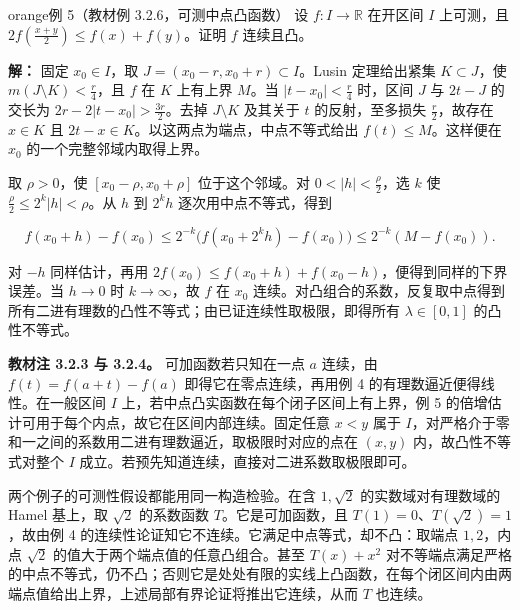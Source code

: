\documentclass[11pt,a4paper]{article}
\begin{document}
\begin{sboxenv}{orange}{例 5（教材例 3.2.6，可测中点凸函数）}
设 \(f:I\to\mathbb R\) 在开区间 \(I\) 上可测，且
\(2f(\frac{x+y}{2})\le f(x)+f(y)\)。证明 \(f\) 连续且凸。

\end{sboxenv}

\textbf{解：} 固定 \(x_0\in I\)，取 \(J=(x_0-r,x_0+r)\subset I\)。Lusin
定理给出紧集 \(K\subset J\)，使 \(m(J\setminus K)<\frac{r}{4}\)，且
\(f\) 在 \(K\) 上有上界 \(M\)。当 \(|t-x_0|<\frac{r}{4}\) 时，区间 \(J\)
与 \(2t-J\) 的交长为 \(2r-2|t-x_0|>\frac{3r}{2}\)。去掉 \(J\setminus K\)
及其关于 \(t\) 的反射，至多损失 \(\frac{r}{2}\)，故存在 \(x\in K\) 且
\(2t-x\in K\)。以这两点为端点，中点不等式给出 \(f(t)\le M\)。这样便在
\(x_0\) 的一个完整邻域内取得上界。

取 \(\rho>0\)，使 \([x_0-\rho,x_0+\rho]\) 位于这个邻域。对
\(0<|h|<\frac{\rho}{2}\)，选 \(k\) 使
\(\frac{\rho}{2}\le 2^k|h|<\rho\)。从 \(h\) 到 \(2^kh\)
逐次用中点不等式，得到

\begin{equation*}
f(x_0+h)-f(x_0)
\le 2^{-k}\bigl(f(x_0+2^kh)-f(x_0)\bigr)
\le 2^{-k}(M-f(x_0)).
\end{equation*}

对 \(-h\) 同样估计，再用
\(2f(x_0)\le f(x_0+h)+f(x_0-h)\)，便得到同样的下界误差。当 \(h\to0\) 时
\(k\to\infty\)，故 \(f\) 在 \(x_0\)
连续。对凸组合的系数，反复取中点得到所有二进有理数的凸性不等式；由已证连续性取极限，即得所有
\(\lambda\in[0,1]\) 的凸性不等式。

\textbf{教材注 3.2.3 与 3.2.4。} 可加函数若只知在一点 \(a\) 连续，由
\(f(t)=f(a+t)-f(a)\) 即得它在零点连续，再用例 4
的有理数逼近便得线性。在一般区间 \(I\)
上，若中点凸实函数在每个闭子区间上有上界，例 5
的倍增估计可用于每个内点，故它在区间内部连续。固定任意 \(x<y\) 属于
\(I\)，对严格介于零和一之间的系数用二进有理数逼近，取极限时对应的点在
\((x,y)\) 内，故凸性不等式对整个 \(I\)
成立。若预先知道连续，直接对二进系数取极限即可。

两个例子的可测性假设都能用同一构造检验。在含 \(1,\sqrt2\)
的实数域对有理数域的 Hamel 基上，取 \(\sqrt2\) 的系数函数
\(T\)。它是可加函数，且 \(T(1)=0\)、\(T(\sqrt2)=1\)，故由例 4
的连续性论证知它不连续。它满足中点等式，却不凸：取端点 \(1,2\)，内点
\(\sqrt2\) 的值大于两个端点值的任意凸组合。甚至 \(T(x)+x^2\)
对不等端点满足严格的中点不等式，仍不凸；否则它是处处有限的实线上凸函数，在每个闭区间内由两端点值给出上界，上述局部有界论证将推出它连续，从而
\(T\) 也连续。
\end{document}
